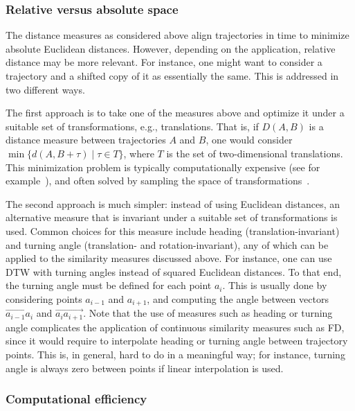 \documentclass[10pt,letterpaper]{article}
\begin{document}
\subsubsection{Relative versus absolute space}

The distance measures as considered above align trajectories in time to minimize absolute Euclidean distances. However, depending on the application, relative distance may be more relevant. For instance, one might want to consider a trajectory and a shifted copy of it as essentially the same. This is addressed in two different ways.

The first approach is to take one of the measures above and optimize it under a suitable set of transformations, e.g., translations. That is, if $D(A,B)$ is a distance measure between trajectories $A$ and $B$, one would consider $\min \{d(A,B + \tau)\;|\; \tau \in T \}$, where $T$ is the set of two-dimensional translations. This minimization problem is typically computationally expensive (see for example~\cite{VlachosGK02}), and often solved by sampling the space of transformations~\cite{as-sm-12}.

The second approach is much simpler: instead of using Euclidean distances, an alternative measure that is invariant under a suitable set of transformations is used. Common choices for this measure include heading (translation-invariant) and turning angle (translation- and rotation-invariant), any of which can be applied to the similarity measures discussed above. For instance, one can use DTW with turning angles instead of squared Euclidean distances. To that end, the turning angle must be defined for each point $a_i$. This is usually done by considering points $a_{i-1}$ and $a_{i+1}$, and computing the angle between vectors $\overrightarrow{a_{i-1} a_{i}}$ and $\overrightarrow{a_{i}a_{i+1}}$. Note that the use of measures such as heading or turning angle complicates the application of continuous similarity measures such as FD, since it would require to interpolate heading or turning angle between trajectory points. This is, in general, hard to do in a meaningful way; for instance, turning angle is always zero between points if linear interpolation is used.

\subsubsection{Computational efficiency}
\end{document}
